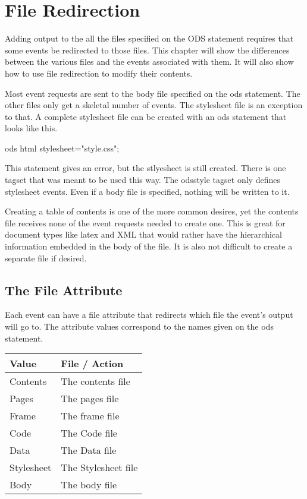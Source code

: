 \chapter{File Redirection}
Adding output to the all the files specified on the ODS 
statement requires that some events be redirected to those
files.  This chapter will show the differences between the
various files and the events associated with them.  It will
also show how to use file redirection to modify their contents.

Most event requests are sent to the body file specified on
the ods statement.  The other files only get a skeletal number
of events.  The stylesheet file is an exception to that.  A
complete stylesheet file can be created with an ods statement
that looks like this.

\begin{sfvcode} 
ods html stylesheet="style.css";
\end{sfvcode} 

This statement gives an error, but the stlyesheet is still created.
There is one tagset that was meant to be used this way.  The odsstyle
tagset only defines stylesheet events.  Even if a body file is specified,
nothing will be written to it.

Creating a table of contents is one of the more common desires, yet the
contents file receives none of the event requests needed to create one.
This is great for document types like latex and XML that would rather 
have the hierarchical information embedded in the body of the file.
It is also not difficult to create a separate file if desired.


\section{The File Attribute}
Each event can have a file attribute that redirects which file the event's
output will go to.  The attribute values correspond to the names given on the
ods statement.
\begin{tabular}{l|l}
Value & File / Action \\ \hline
Contents & The contents file \\
Pages  & The pages file   \\
Frame  & The frame file   \\
Code  & The Code file   \\
Data  & The Data file   \\
Stylesheet  & The Stylesheet file \\
Body  & The body file \\ \hline
\end{tabular}

